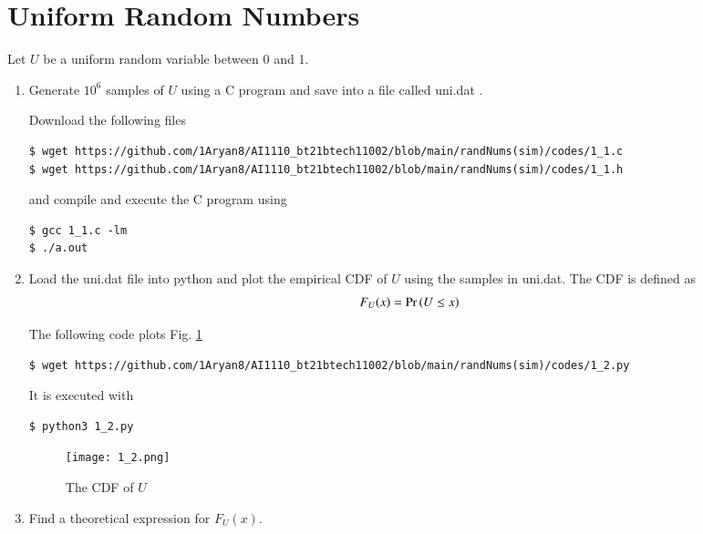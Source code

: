 \documentclass[journal,12pt,twocolumn]{IEEEtran}
\renewcommand\thesection{\arabic{section}}
\begin{document}
\section{Uniform Random Numbers}
Let $U$ be a uniform random variable between 0 and 1.
\begin{enumerate}[label=\thesection.\arabic*
,ref=\thesection.\theenumi]
\item Generate $10^6$ samples of $U$ using a C program and save into a file called uni.dat .

\solution Download the following files
\begin{lstlisting}
$ wget https://github.com/1Aryan8/AI1110_bt21btech11002/blob/main/randNums(sim)/codes/1_1.c
$ wget https://github.com/1Aryan8/AI1110_bt21btech11002/blob/main/randNums(sim)/codes/1_1.h
\end{lstlisting}
and compile and execute the C program using
\begin{lstlisting}
$ gcc 1_1.c -lm 
$ ./a.out
\end{lstlisting}
%
\item
Load the uni.dat file into python and plot the empirical CDF of $U$ using the samples in uni.dat. The CDF is defined as
\begin{align}
F_{U}(x) = \Pr\left(U \leq x\right)
\end{align}

\solution  The following code plots Fig. \ref{fig:uni_cdf}
\begin{lstlisting}
$ wget https://github.com/1Aryan8/AI1110_bt21btech11002/blob/main/randNums(sim)/codes/1_2.py
\end{lstlisting}
It is executed with
\begin{lstlisting}
$ python3 1_2.py
\end{lstlisting}
\begin{figure}
\centering
\texttt{[image: 1\_2.png]}
\caption{The CDF of $U$}
\label{fig:uni_cdf}
%
\end{figure}
\item
Find a theoretical expression for $F_{U}(x)$.


\end{enumerate}
\end{document}
